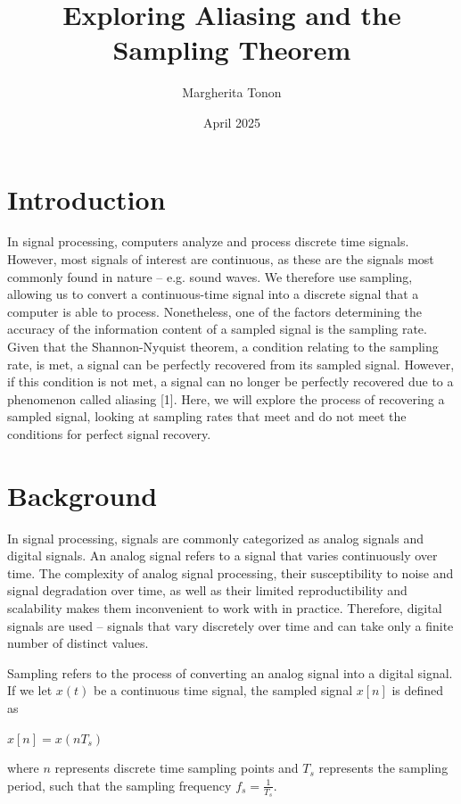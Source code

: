 \documentclass{article}
\title{Exploring Aliasing and the Sampling Theorem} %
\author{Margherita Tonon}
\date{April 2025}
\begin{document}
\maketitle

\section{Introduction}
In signal processing, computers analyze and process discrete time signals. 
However, most signals of interest are continuous, as these are the signals most commonly found in nature -- e.g. sound waves.
We therefore use sampling, allowing us to convert a continuous-time signal into a discrete signal that a computer is able to process.
Nonetheless, one of the factors determining the accuracy of the information content of a sampled signal is the sampling rate. %
Given that the Shannon-Nyquist theorem, a condition relating to the sampling rate, is met, a signal can be perfectly recovered from its sampled signal. 
However, if this condition is not met, a signal can no longer be perfectly recovered due to a phenomenon called aliasing [1].
Here, we will explore the process of recovering a sampled signal, looking at sampling rates that meet and do not meet the conditions for perfect signal recovery.


\section{Background}
In signal processing, signals are commonly categorized as analog signals and digital signals.
An analog signal refers to a signal that varies continuously over time. 
The complexity of analog signal processing, their susceptibility to noise and signal degradation over time, as well as their limited reproductibility and scalability makes them inconvenient to work with in practice. 
Therefore, digital signals are used -- signals that vary discretely over time and can take only a finite number of distinct values.

Sampling refers to the process of converting an analog signal into a digital signal. If we let $x(t)$ be a continuous time signal, the sampled signal $x[n]$ is defined as
\begin{center}
    \begin{math}
        x[n] = x(nT_s)
    \end{math}  
\end{center}
where $n$ represents discrete time sampling points and $T_s$ represents the sampling period, such that the sampling frequency $f_s = \frac{1}{T_s}$.
\end{document}
